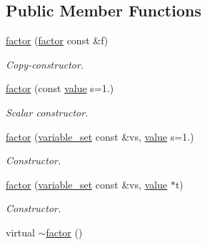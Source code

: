 \subsection*{Public Member Functions}
\begin{DoxyCompactItemize}
\item 
\hyperlink{classmerlin_1_1factor_ad60ed4da09302aac8c5163bb0040e26d}{factor} (\hyperlink{classmerlin_1_1factor}{factor} const \&f)
\begin{DoxyCompactList}\small\item\em Copy-\/constructor. \end{DoxyCompactList}\item 
\hyperlink{classmerlin_1_1factor_ae5c45e239cbedf66b237f5b77b3887cb}{factor} (const \hyperlink{classmerlin_1_1factor_a1b14d19e509403448fbef26b003c9281}{value} s=1.)
\begin{DoxyCompactList}\small\item\em Scalar constructor. \end{DoxyCompactList}\item 
\hyperlink{classmerlin_1_1factor_ad51a55b844059e2cba12af733e31904a}{factor} (\hyperlink{classmerlin_1_1variable__set}{variable\+\_\+set} const \&vs, \hyperlink{classmerlin_1_1factor_a1b14d19e509403448fbef26b003c9281}{value} s=1.)
\begin{DoxyCompactList}\small\item\em Constructor. \end{DoxyCompactList}\item 
\hyperlink{classmerlin_1_1factor_aedf339b91386fbffd3821890338f6cb8}{factor} (\hyperlink{classmerlin_1_1variable__set}{variable\+\_\+set} const \&vs, \hyperlink{classmerlin_1_1factor_a1b14d19e509403448fbef26b003c9281}{value} $\ast$t)
\begin{DoxyCompactList}\small\item\em Constructor. \end{DoxyCompactList}\item 
\hypertarget{classmerlin_1_1factor_aaa50fa2be90bd54297728d19d8ff7dea}{}virtual \hyperlink{classmerlin_1_1factor_aaa50fa2be90bd54297728d19d8ff7dea}{$\sim$factor} ()\label{classmerlin_1_1factor_aaa50fa2be90bd54297728d19d8ff7dea}


\end{DoxyCompactItemize}
